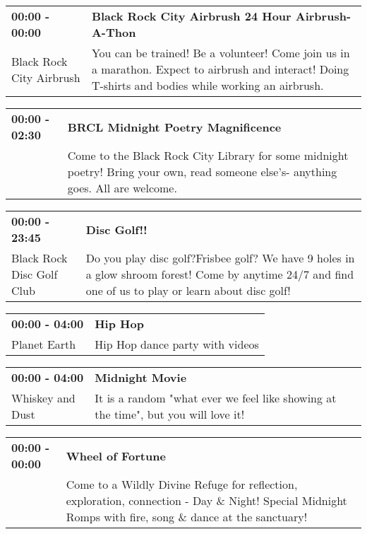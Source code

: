 \begin{tabular}{ p{1in} p{2.2in} }
    \textbf{00:00 - 00:00} & \textbf{Black Rock City Airbrush 24 Hour Airbrush-A-Thon} \\
    Black Rock City Airbrush \newline  & You can be trained! Be a volunteer! Come join us in a marathon. Expect to airbrush and interact! Doing T-shirts and bodies while working an airbrush. \\
    \hline 
\end{tabular}
    
\begin{tabular}{ p{1in} p{2.2in} }
    \textbf{00:00 - 02:30} & \textbf{BRCL Midnight Poetry Magnificence} \\
    ~ \newline  & Come to the Black Rock City Library for some midnight poetry! Bring your own, read someone else's- anything goes.  All are welcome. \\
    \hline 
\end{tabular}
    
\begin{tabular}{ p{1in} p{2.2in} }
    \textbf{00:00 - 23:45} & \textbf{Disc Golf!!} \\
    Black Rock Disc Golf Club \newline  & Do you play disc golf?Frisbee golf? We have 9 holes in a glow shroom forest! Come by anytime 24/7 and find one of us to play or learn about disc golf! \\
    \hline 
\end{tabular}
    
\begin{tabular}{ p{1in} p{2.2in} }
    \textbf{00:00 - 04:00} & \textbf{Hip Hop} \\
    Planet Earth \newline  & Hip Hop dance party with videos \\
    \hline 
\end{tabular}
    
\begin{tabular}{ p{1in} p{2.2in} }
    \textbf{00:00 - 04:00} & \textbf{Midnight Movie} \\
    Whiskey and Dust \newline  & It is a random "what ever we feel like showing at the time", but you will love it! \\
    \hline 
\end{tabular}
    
\begin{tabular}{ p{1in} p{2.2in} }
    \textbf{00:00 - 00:00} & \textbf{Wheel of Fortune} \\
    ~ \newline  & Come to a Wildly Divine Refuge for reflection, exploration, connection - Day \& Night! Special Midnight Romps with fire, song \& dance at the sanctuary! \\
    \hline 
\end{tabular}
    
